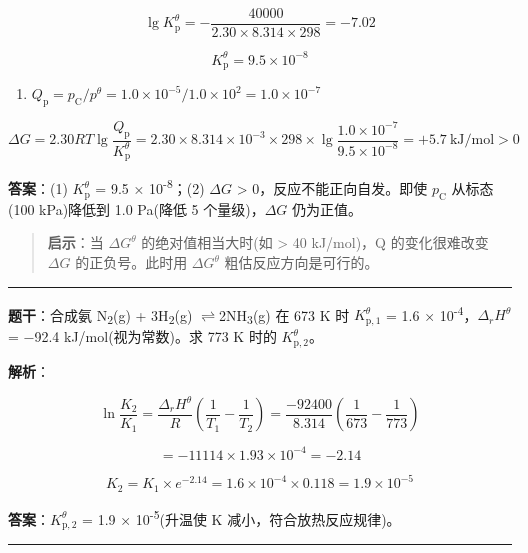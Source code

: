 \documentclass[a4paper,11pt]{ctexart}
\providecommand{\tightlist}{\setlength{\itemsep}{0pt}\setlength{\parskip}{0pt}}
\newcommand{\箭}{\ensuremath{\rightarrow}}
\newcommand{\左箭}{\ensuremath{\leftarrow}}
\newcommand{\上箭}{\ensuremath{\uparrow}}
\newcommand{\下箭}{\ensuremath{\downarrow}}
\newcommand{\衡}{\ensuremath{\rightleftharpoons}}
\newcommand{\双箭}{\ensuremath{\leftrightarrow}}
\newcommand{\约等于}{\ensuremath{\approx}}
\newcommand{\小于等于}{\ensuremath{\leq}}
\newcommand{\大于等于}{\ensuremath{\geq}}
\newcommand{\不等于}{\ensuremath{\neq}}
\newcommand{\西格马}{\ensuremath{\sigma}}
\newcommand{\派}{\ensuremath{\pi}}
\begin{document}
\[\lg K_{\mathrm p}^\theta = -\frac{40000}{2.30 \times 8.314 \times 298} = -7.02\]

\[K_{\mathrm p}^\theta = 9.5 \times 10^{-8}\]

\begin{enumerate}
\def\labelenumi{(\arabic{enumi})}
\setcounter{enumi}{1}
\tightlist
\item
  \(Q_{\mathrm p} = p_{\mathrm C}/p^\theta = 1.0 \times 10^{-5} / 1.0 \times 10^2 = 1.0 \times 10^{-7}\)
\end{enumerate}

\[\Delta G = 2.30RT\lg\frac{Q_{\mathrm p}}{K_{\mathrm p}^\theta} = 2.30 \times 8.314 \times 10^{-3} \times 298 \times \lg\frac{1.0 \times 10^{-7}}{9.5 \times 10^{-8}} = +5.7\ \mathrm{kJ/mol} > 0\]

\textbf{答案}：(1) \(K_{\mathrm p}^\theta\) = 9.5 × 10\textsuperscript{-8}；(2) \(\Delta G\) \textgreater{} 0，反应不能正向自发。即使 \(p_{\mathrm C}\) 从标态(100 kPa)降低到 1.0 Pa(降低 5 个量级)，\(\Delta G\) 仍为正值。

\begin{quote}
\textbf{启示}：当 \(\Delta G^\theta\) 的绝对值相当大时(如 \textgreater{} 40 kJ/mol)，Q 的变化很难改变 \(\Delta G\) 的正负号。此时用 \(\Delta G^\theta\) 粗估反应方向是可行的。
\end{quote}

\begin{center}\rule{0.5\linewidth}{0.5pt}\end{center}

\textbf{题干}：合成氨 N\textsubscript{2}(g) + 3H\textsubscript{2}(g) \衡 2NH\textsubscript{3}(g) 在 673 K 时 \(K_{\mathrm p,1}^\theta\) = 1.6 × 10\textsuperscript{-4}，\(\Delta_r H^\theta\) = −92.4 kJ/mol(视为常数)。求 773 K 时的 \(K_{\mathrm p,2}^\theta\)。

\textbf{解析}：

\[\ln\frac{K_2}{K_1} = \frac{\Delta_r H^\theta}{R}\left(\frac{1}{T_1} - \frac{1}{T_2}\right) = \frac{-92400}{8.314}\left(\frac{1}{673} - \frac{1}{773}\right)\]

\[= -11114 \times 1.93 \times 10^{-4} = -2.14\]

\[K_2 = K_1 \times e^{-2.14} = 1.6 \times 10^{-4} \times 0.118 = 1.9 \times 10^{-5}\]

\textbf{答案}：\(K_{\mathrm p,2}^\theta\) = 1.9 × 10\textsuperscript{-5}(升温使 K 减小，符合放热反应规律)。

\begin{center}\rule{0.5\linewidth}{0.5pt}\end{center}
\end{document}
